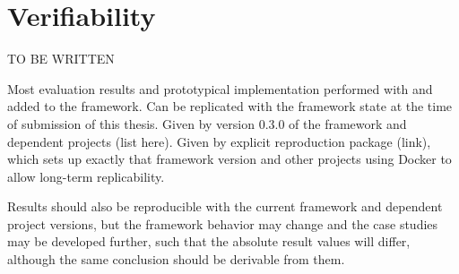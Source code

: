 \chapter{Verifiability}
\label{chap:appendix:verifiability}

TO BE WRITTEN

Most evaluation results and prototypical implementation performed with and added to the \vitruv framework.
Can be replicated with the framework state at the time of submission of this thesis.
Given by version 0.3.0 of the framework and dependent projects (list here).
Given by explicit reproduction package (link), which sets up exactly that framework version and other projects using Docker to allow long-term replicability.

Results should also be reproducible with the current framework and dependent project versions, but the framework behavior may change and the case studies may be developed further, such that the absolute result values will differ, although the same conclusion should be derivable from them.